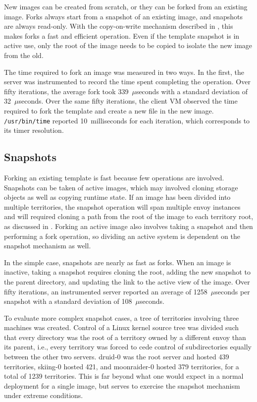 New images can be created from scratch, or they can be forked from an existing image. Forks always start from a snapshot of an existing image, and snapshots are always read-only. With the copy-on-write mechanism described in , this makes forks a fast and efficient operation. Even if the template snapshot is in active use, only the root of the image needs to be copied to isolate the new image from the old.

The time required to fork an image was measured in two ways. In the first, the server was instrumented to record the time spent completing the operation. Over fifty iterations, the average fork took 339~$\mu$seconds with a standard deviation of 32~$\mu$seconds. Over the same fifty iterations, the client VM observed the time required to fork the template and create a new file in the new image. \texttt{/usr/bin/time} reported 10~milliseconds for each iteration, which corresponds to its timer resolution.

\subsection{Snapshots}

Forking an existing template is fast because few operations are involved. Snapshots can be taken of active images, which may involved cloning storage objects as well as copying runtime state. If an image has been divided into multiple territories, the snapshot operation will span multiple envoy instances and will required cloning a path from the root of the image to each territory root, as discussed in . Forking an active image also involves taking a snapshot and then performing a fork operation, so dividing an active system is dependent on the snapshot mechanism as well.

In the simple case, snapshots are nearly as fast as forks. When an image is inactive, taking a snapshot requires cloning the root, adding the new snapshot to the parent directory, and updating the link to the active view of the image. Over fifty iterations, an instrumented server reported an average of 1258~$\mu$seconds per snapshot with a standard deviation of 108~$\mu$seconds.

To evaluate more complex snapshot cases, a tree of territories involving three machines was created. Control of a Linux kernel source tree was divided such that every directory was the root of a territory owned by a different envoy than its parent, i.e., every territory was forced to cede control of subdirectories equally between the other two servers. druid-0 was the root server and hosted 439 territories, skiing-0 hosted 421, and moonraider-0 hosted 379 territories, for a total of 1239 territories. This is far beyond what one would expect in a normal deployment for a single image, but serves to exercise the snapshot mechanism under extreme conditions.

